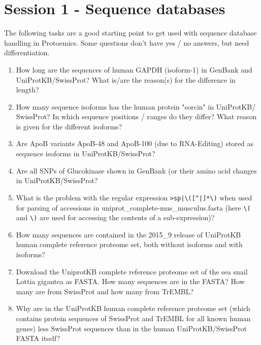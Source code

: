 
\section{Session 1 - Sequence databases}
\label{Session 1 - Sequence databases}
\begin{task}

The following tasks are a good starting point to get used with sequence database handling in Protoemics. Some questions don't have yes / no answers, but need differentiation.
\begin{enumerate}
\item How long are the sequences of human GAPDH (isoform-1) in GenBank and UniProtKB/SwissProt? What is/are the reason(s) for the difference in length?
\item How many sequence isoforms has the human protein "sorcin" in \mbox{UniProtKB}/ SwissProt? In which sequence positions / ranges do they differ? What reason is given for the different isoforms?
\item Are ApoB variants ApoB-48 and ApoB-100 (due to RNA-Editing) stored as sequence isoforms in UniProtKB/SwissProt?
\item Are all SNPs of Glucokinase shown in GenBank (or their amino acid changes in UniProtKB/SwissProt?
\item What is the problem with the regular expression \verb+>sp|\([^|]*\)+ when used for parsing of accessions in uniprot\_complete-mus\_musculus.fasta (here \verb+\(+ and \verb+\)+ are used for accessing the contents of a sub-expression)?
\item How many sequences are contained in the 2015\_9 release of UniProtKB human complete reference  proteome set, both without isoforms and with isoforms?
\item Download the UniprotKB complete reference proteome set of the sea snail Lottia gigantea as FASTA. How many sequences are in the FASTA? How many are from SwissProt and how many from TrEMBL?
\item Why are in the UniProtKB human complete reference proteome set (which contains protein sequences of SwissProt and TrEMBL for all known human genes) less SwissProt sequences than in the human UniProtKB/SwissProt FASTA itself?

\end{enumerate}
\end{task}
